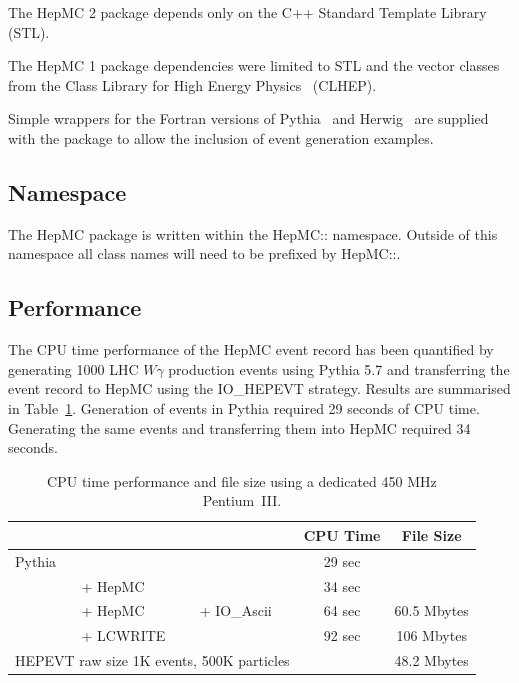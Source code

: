 \documentclass[11pt,letterpaper]{article}
\begin{document}
The HepMC 2 package  depends only on the C++ Standard
Template Library~\cite{stl} (STL).

The HepMC 1 package dependencies were limited to STL 
and the vector classes from the
Class Library for High Energy Physics~\cite{clhep} (CLHEP).  

Simple wrappers for the Fortran versions of Pythia~\cite{Sjostrand:2001yb} 
and Herwig~\cite{herwig} are supplied with the
package to allow the inclusion of event generation examples.

\subsection{Namespace}

The HepMC package is written within the HepMC:: namespace. Outside of
this namespace all class names will need to be prefixed by HepMC::.

\subsection{Performance}

The CPU time performance of the HepMC event record has been quantified
by generating 1000 LHC $W\gamma$ production events using Pythia 5.7
and transferring the event record to HepMC using the IO\_HEPEVT
strategy. Results are summarised in Table~\ref{benchmarks}.
Generation of events in Pythia required 29 seconds of CPU time.
Generating the same events and transferring them into HepMC required
34 seconds.

\begin{table}[h]
\begin{center}
\begin{tabular}{|l l l|c|c|} \hline
&&&CPU Time & File Size \\ \hline
Pythia &           &          & 29 sec & \\
       & + {\color{red}HepMC}   &          & 34 sec & \\ \hline
       & + {\color{red}HepMC} & + {\color{red}IO\_Ascii} 
       & 64 sec & 60.5 Mbytes \\
       & + {\color{green}LCWRITE} &          
       & 92 sec & 106 Mbytes \\
\multicolumn{3}{|l|}{HEPEVT raw size 1K events, 500K particles}
&& 48.2 Mbytes \\ \hline
\end{tabular}
\end{center}
\caption{\label{benchmarks} 
  CPU time performance and file size using a dedicated 450 MHz Pentium~III.}
\end{table}
\end{document}
